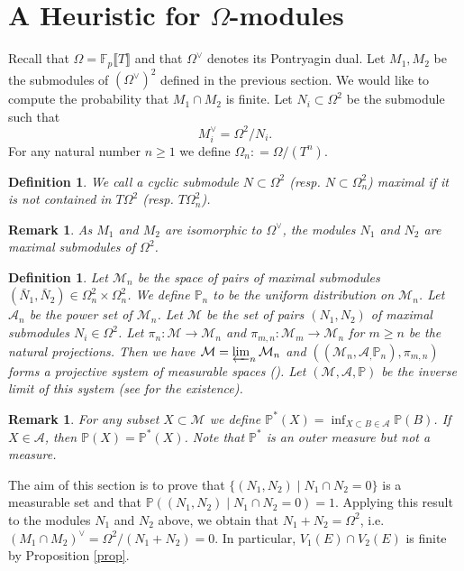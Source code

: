 \documentclass[12pt]{amsart}
\newtheorem{definition}[theorem]{Definition}
\newtheorem{remark}[theorem]{Remark}
\newcommand{\Prob}{\mathbb{P}}
\numberwithin{equation}{section}
\begin{document}
\section{A Heuristic for $\Omega$-modules}\label{s 4}
Recall that $\Omega=\mathbb{F}_p\llbracket T\rrbracket$ and that $\Omega^\vee$ denotes its Pontryagin dual. Let $M_1,M_2$ be the submodules of $(\Omega^\vee)^2$ defined in the previous section. We would like to compute the probability that $M_1\cap M_2$ is finite. Let $N_i\subset \Omega^2$ be the submodule such that
\[M_i^\vee=\Omega^2/N_i.\]
For any natural number $n\ge 1$ we define $\Omega_n\colon =\Omega/(T^n)$.
\begin{definition}
    We call a cyclic submodule $N\subset \Omega^2$ (resp. $N\subset \Omega_n^2$) maximal if it is not contained in $T\Omega^2$ (resp. $T\Omega_n^2$). 
\end{definition}
\begin{remark}
     As $M_1$ and $M_2$ are isomorphic to $\Omega^\vee$, the modules $N_1$ and $N_2$ are maximal submodules of $\Omega^2$.  
\end{remark}
\begin{definition}
    Let $\mathcal{M}_n$ be the space of pairs of maximal submodules $(\bar{N}_1, \bar{N}_2)\in \Omega_n^2\times \Omega_n^2$. We define $\mathbb{P}_n$ to be the uniform distribution on $\mathcal{M}_n$. Let $\mathcal{A}_n$ be the power set of $\mathcal{M}_n$. Let $\mathcal{M}$ be the set of pairs $(N_1, N_2)$ of maximal submodules $N_i\in \Omega^2$. Let $\pi_n\colon \mathcal{M}\to \mathcal{M}_{n}$ and $\pi_{m,n}\colon \mathcal{M}_m\to \mathcal{M}_n$ for $m\ge n$ be the natural projections. Then we have $\mathcal{M}=\varprojlim_n \mathcal{M}_n$ and $((\mathcal{M}_n,\mathcal{A}_,\mathbb{P}_n),\pi_{m,n})$ forms a projective system of measurable spaces (\cite[Definition 2.2]{pinter}). Let $(\mathcal{M},\mathcal{A},\mathbb{P})$ be the inverse limit of this system (see \cite[Theorem 3.2]{pinter} for the existence).    
\end{definition}
\begin{remark}
   For any subset $X\subset \mathcal{M}$ we define $\mathbb{P}^*(X)=\inf_{X\subset B\in \mathcal{A}}\mathbb{P}(B)$. If $X\in \mathcal{A}$, then $\mathbb{P}(X)=\mathbb{P}^*(X)$. Note that $\Prob^*$ is an outer measure but not a measure.
\end{remark}

The aim of this section is to prove that $\{(N_1,N_2)\mid N_1\cap N_2=0\}$ is a measurable set and that $\Prob((N_1,N_2)\mid N_1\cap N_2=0)=1$. Applying this result to the modules $N_1$ and $N_2$ above, we obtain that $N_1+N_2=\Omega^2$, i.e. $(M_1\cap M_2)^\vee=\Omega^2/(N_1+N_2)=0$. In particular, $V_1(E)\cap V_2(E)$ is finite by Proposition \ref{prop}.
\end{document}
